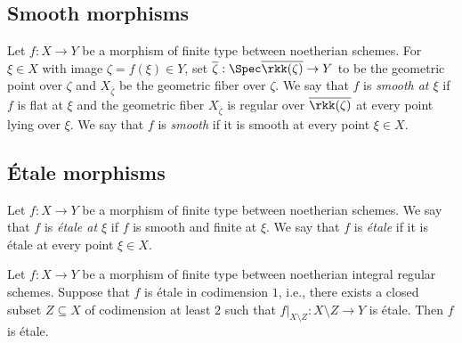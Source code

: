 \subsection{Smooth morphisms}

    \begin{definition}\label{def:smooth_morphism}
        Let \(f:X\to Y\) be a morphism of finite type between noetherian schemes.
        For \(\xi \in X\) with image \(\zeta = f(\xi) \in Y\), set \(\overline{\zeta}: \Spec \overline{\rkk(\zeta)} \to Y\) to be the geometric point over \(\zeta\) and \(X_{\overline{\zeta}}\) be the geometric fiber over \(\zeta\).
        We say that \(f\) is \emph{smooth at \(\xi\)} if \(f\) is flat at \(\xi\) and the geometric fiber \(X_{\overline{\zeta}}\) is regular over \(\overline{\rkk(\zeta)}\) at every point lying over \(\xi\).
        We say that \(f\) is \emph{smooth} if it is smooth at every point \(\xi \in X\).
    \end{definition}


\subsection{\'Etale morphisms}

    \begin{definition}\label{def:etale_morphism}
        Let \(f:X\to Y\) be a morphism of finite type between noetherian schemes.
        We say that \(f\) is \emph{\'etale at \(\xi\)} if \(f\) is smooth and finite at \(\xi\).
        We say that \(f\) is \emph{\'etale} if it is \'etale at every point \(\xi \in X\).
    \end{definition}

    \begin{theorem}\label{thm:purity_of_branch_locus}
        Let \(f:X\to Y\) be a morphism of finite type between noetherian integral regular schemes.
        Suppose that \(f\) is \'etale in codimension \(1\), i.e., there exists a closed subset \(Z \subseteq X\) of codimension at least \(2\) such that \(f|_{X\setminus Z}:X\setminus Z \to Y\) is \'etale.
        Then \(f\) is \'etale.
    \end{theorem}
